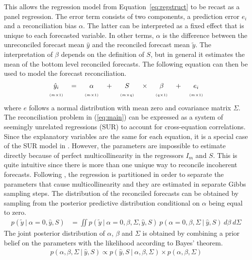 \documentclass[a4paper,fleqn,11pt]{article}
\begin{document}
This allows the regression model from Equation~\ref{eq:regstruct} to be recast as a panel regression.  The error term consists of two components, a prediction error $e_{i}$ and a reconciliation bias $\alpha$. The latter can be interpreted as a fixed effect that is unique to each forecasted variable. In other terms, $\alpha$ is the difference between the unreconciled forecast mean $\hat{y}$ and the reconciled forecast mean $\tilde{y}$. The interpretation of $\beta$ depends on the definition of $S$, but in general it estimates the mean of the bottom level reconciled forecasts. The following equation can then be used to model the forecast reconciliation.
\begin{align}
\label{eq:main}
\begin{tabular}{ccccccccc}
	$\hat{y}_i$ & $=$ & $\alpha$ & + &$S$ & $\times$ & $\beta$ & $+$ & $e_i$ \\
	$\scriptscriptstyle (m\times 1)$ & & $\scriptscriptstyle (m\times 1)$  & & $ \scriptscriptstyle (m\times q) $ & & $\scriptscriptstyle (q\times 1)$ & & $\scriptscriptstyle (m\times 1)$
\end{tabular}
\end{align}
where $e$ follows a normal distribution with mean zero and covariance matrix $\Sigma$. The reconciliation problem in (\ref{eq:main}) can be expressed as a system of seemingly unrelated regressions (SUR) to account for cross-equation correlations. Since the explanatory variables are the same for each equation, it is a special case of the SUR model in \cite{Zellner1962}. However, the parameters are impossible to estimate directly because of perfect multicollinearity in the regressors $I_m$ and $S$. This is quite intuitive since there is more than one unique way to reconcile incoherent forecasts. Following \cite{Farebrother1978}, the regression is partitioned in order to separate the parameters that cause multicollinearity and they are estimated in separate Gibbs sampling steps. The distribution of the reconciled forecasts can be obtained by sampling from the posterior predictive distribution conditional on $\alpha$ being equal to zero.
\begin{align*}
p(\tilde{y}\ |\ \alpha = 0,\hat{y}, S) &= \iint p(\tilde{y}\  |\  \alpha = 0,\beta,\Sigma,\hat{y},S)\ p(\alpha = 0,\beta,\Sigma\  |\  \hat{y},S)\ d\beta\ d\Sigma
\end{align*}
The joint posterior distribution of $\alpha$, $\beta$ and $\Sigma$ is obtained by combining a prior belief on the parameters with the likelihood according to Bayes' theorem.
\begin{align}
p(\alpha, \beta, \Sigma\ |\ \hat{y}, S) \propto p(\hat{y}, S\ |\ \alpha, \beta, \Sigma) \times p(\alpha, \beta, \Sigma)
\end{align}
\end{document}
